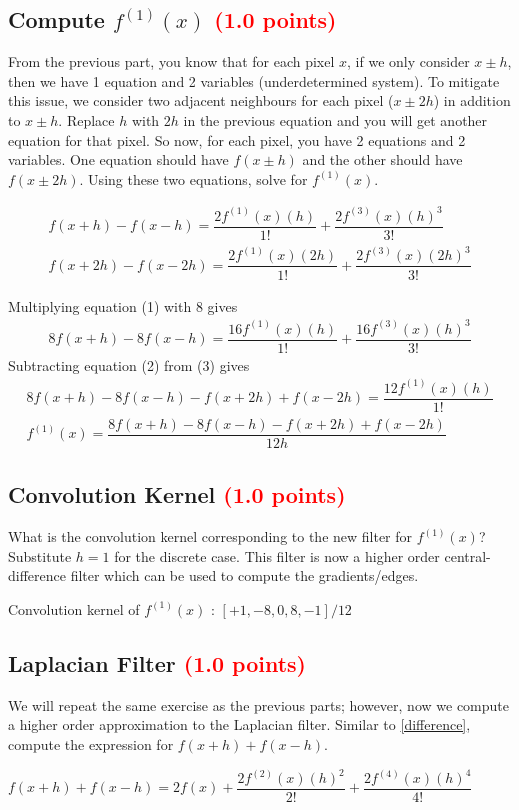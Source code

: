 \documentclass[answers]{exam}
\newcommand{\mypoints}[1]{\textcolor{red}{(#1 points)}}
\begin{document}
\subsection{Compute $f^{(1)}(x)$ \mypoints{1.0}}
\label{gradient}
From the previous part, you know that for each pixel $x$, if we only consider $x \pm h$, then we have 1 equation and 2 variables (underdetermined system). To mitigate this issue, we consider two adjacent neighbours for each pixel ($x \pm 2h$) in addition to $x \pm h$. Replace $h$ with $2h$ in the previous equation and you will get another equation for that pixel. So now, for each pixel, you have 2 equations and 2 variables. One equation should have $f(x \pm h)$ and the other should have $f(x \pm 2h)$. Using these two equations, solve for $f^{(1)}(x)$.
\begin{solution}
\begin{align}
f(x+h) - f(x-h) =  \dfrac{2f^{(1)}(x)(h)}{1!} + \dfrac{2f^{(3)}(x)(h)^3}{3!}\\
f(x+2h) - f(x-2h) =  \dfrac{2f^{(1)}(x)(2h)}{1!} + \dfrac{2f^{(3)}(x)(2h)^3}{3!}
\end{align} 

Multiplying equation (1) with 8 gives 
\begin{align}
8f(x+h) - 8f(x-h) =  \dfrac{16f^{(1)}(x)(h)}{1!} + \dfrac{16f^{(3)}(x)(h)^3}{3!}
\end{align} 
Subtracting equation (2) from (3) gives
\begin{align}
8f(x+h) - 8f(x-h) - f(x+2h) + f(x-2h)=  \dfrac{12f^{(1)}(x)(h)}{1!}\\
f^{(1)}(x) = \dfrac{8f(x+h) - 8f(x-h) - f(x+2h) + f(x-2h)}{12h}
\end{align} 

\end{solution}

\subsection{Convolution Kernel \mypoints{1.0}}
What is the convolution kernel corresponding to the new filter for $f^{(1)}(x)$? Substitute $h=1$ for the discrete case. This filter is now a higher order central-difference filter which can be used to compute the gradients/edges.
\begin{solution}
Convolution kernel of $f^{(1)}(x)$ :
$[+1, -8, 0, 8, -1]/12$
\end{solution}

\subsection{Laplacian Filter \mypoints{1.0}}
We will repeat the same exercise as the previous parts; however, now we compute a higher order approximation to the Laplacian filter. Similar to \ref{difference}, compute the expression for $f(x+h) + f(x-h)$.
\begin{solution}
$f(x+h) + f(x-h) = 2f(x) + \dfrac{2f^{(2)}(x)(h)^2}{2!} + \dfrac{2f^{(4)}(x)(h)^4}{4!}$
\end{solution}
\end{document}
